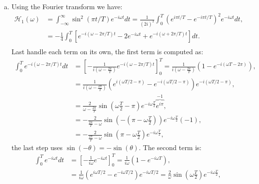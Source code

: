 \begin{enumerate}
        \begin{enumerate}[a)]
          \item Using the Fourier transform we have:
                \begin{align*}
                  \mathcal{H}_{1}(\omega) & =\int_{-\infty}^{\infty}\sin^{2}(\pi t/T)e^{-i\omega t}dt=\frac{1}{(2i)^{2}}\int_{0}^{T}\left(e^{i \pi t/T}-e^{-i\pi t/T}\right)^{2}e^{-i\omega t}dt, \\
                                          & =-\frac{1}{4}\int_{0}^{T}\left[e^{-i(\omega -2\pi/T)t}-2e^{-i\omega t}+e^{-i(\omega + 2\pi/T)t}\right]dt.                                             \\
                \end{align*}
                Last handle each term on its own, the first term is computed as:
                \begin{align*}
                  \int_{0}^{T}e^{-i(\omega-2\pi/T)t}dt & =\left[-\frac{1}{i(\omega-\frac{2\pi}{T})}e^{-i(\omega-2\pi/T)t}\right]_{0}^{T}=\frac{1}{i(\omega-\frac{2\pi}{T})}(1-e^{-i(\omega T-2\pi)}), \\
                                                       & =\frac{1}{i(\omega-\frac{2\pi}{T})}(e^{i(\omega T/2-\pi)}-e^{-i(\omega T/2-\pi)})e^{-i(\omega T/2-\pi)},                                     \\
                                                       & =\frac{2}{\omega-\frac{2\pi}{T}}\sin\left(\omega\frac{T}{2}-\pi\right)e^{-i\omega\frac{T}{2}}\overbrace{e^{i\pi}}^{-1},                      \\
                                                       & =-\frac{2}{\frac{2\pi}{T}-\omega}\sin\left(-\left(\pi-\omega\frac{T}{2}\right)\right)e^{-i\omega\frac{T}{2}}(-1),                            \\
                                                       & =-\frac{2}{\frac{2\pi}{T}-\omega}\sin\left(\pi-\omega\frac{T}{2}\right)e^{-i\omega\frac{T}{2}},
                \end{align*}
                the last step uses $\sin(-\theta)=-\sin(\theta)$. The second term is:
                \begin{align*}
                  \int_{0}^{T}e^{-i\omega t}dt & =\left[-\frac{1}{i\omega}e^{-i\omega t}\right]_{0}^{T}=\frac{1}{i\omega}(1-e^{-i\omega T}),                                                      \\
                                               & =\frac{1}{i\omega}(e^{i\omega T/2}-e^{-i\omega T/2})e^{-i\omega T/2}=\frac{2}{\omega}\sin\left(\omega\frac{T }{2}\right)e^{-i\omega\frac{T}{2}},

\end{align*}
\end{enumerate}
\end{enumerate}
